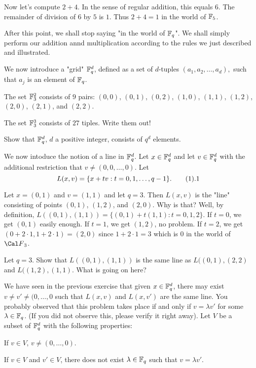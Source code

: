 Now let's compute $2+4$. In the sense of regular addition, this equals
$6$. The remainder of division of $6$ by $5$ is $1$. Thus $2+4=1$ in the
world of ${\Bbb F}_5$.

After this point, we shall stop saying "in the world of ${\Bbb F}_q$". We
shall simply perform our addition annd multiplication according to the
rules we just described and illustrated. \endproclaim

We now introduce a "grid" ${\Bbb F}_q^d$, defined as a set of $d$-tuples
$ (a_1, a_2, \dots, a_d), $ such that $a_j$ is an element of ${\Bbb
F}_q$.

 The set ${\Bbb F}_3^2$ consists of $9$ pairs:
$(0,0)$,
$(0,1)$, $(0,2)$, $(1,0)$, $(1,1)$, $(1,2)$, $(2,0)$, $(2,1)$, and
$(2,2)$.

The set ${\Bbb F}_3^3$ consists of $27$ tiples. Write them out!

\endproclaim

 Show that ${\Bbb F}_q^d$, $d$ a positive integer,
consists of $q^d$ elements.

\endproclaim

We now intoduce the notion of a line in ${\Bbb F}_q^d$. Let $x \in {\Bbb
F}_q^d$ and let $v \in {\Bbb F}_q^d$ with the additional restriction that
$v \not=(0,0, \dots, 0)$. Let
$$ L(x,v)=\{x+tv: t=0,1, \dots, q-1\}. \tag1.1$$

 Let $x=(0,1)$ and $v=(1,1)$ and let $q=3$. Then
$L(x,v)$ is the "line" consisting of points $(0,1)$, $(1,2)$, and
$(2,0)$. Why is that? Well, by definition, $L((0,1),
(1,1))=\{(0,1)+t(1,1):t=0,1,2\}$. If
$t=0$, we get $(0,1)$ easily enough. If $t=1$, we get $(1,2)$, no
problem. If $t=2$, we get $(0+2 \cdot 1, 1+2 \cdot 1)=(2,0)$ since $1+2
\cdot1=3$ which is $0$ in the world of ${\Cal F}_3$. \endproclaim

 Let $q=3$. Show that $L((0,1),(1,1))$ is the same
line as $L((0,1),(2,2)$ and $L((1,2),(1,1)$. What is going on
here? \endproclaim

 We have seen in the previous exercise that given
$x \in {\Bbb F}_q^d$, there may exist $v \not=v' \not=(0,\dots,0$ such
that $L(x,v)$ and $L(x,v')$ are the same line. You probably observed that
this problem takes place if and only if $v=\lambda v'$ for some $\lambda
\in {\Bbb F}_q$. (If you did not observe this, please verify it right
away). Let $V$ be a subset of ${\Bbb F}_q^d$ with the following
properties: \roster \item If $v \in V$, $v \not=(0,\dots,0)$. \item If $v
\in V$ and $v' \in V$, there does not exist $\lambda \in {\Bbb F}_q$ such
that $v=\lambda v'$. \endroster

